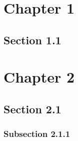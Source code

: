 \section{Chapter 1}
\lipsum[1-10] %

\subsection{Section 1.1}
\lipsum[1-10] %

\section{Chapter 2}
\lipsum[1-10] %

\subsection{Section 2.1}
\lipsum[1-10] %

\subsubsection{Subsection 2.1.1}
\lipsum[1-10] %
